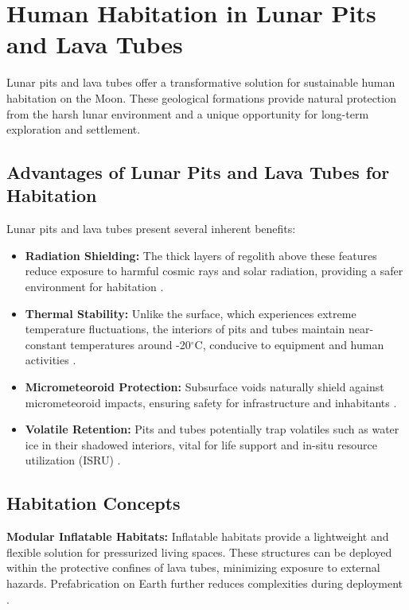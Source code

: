 \graphicspath{{img/ch6}}

\section{Human Habitation in Lunar Pits and Lava Tubes}

Lunar pits and lava tubes offer a transformative solution for sustainable human habitation on the Moon. These geological formations provide natural protection from the harsh lunar environment and a unique opportunity for long-term exploration and settlement.

\subsection{Advantages of Lunar Pits and Lava Tubes for Habitation}

Lunar pits and lava tubes present several inherent benefits:
\begin{itemize}
    \item \textbf{Radiation Shielding:} The thick layers of regolith above these features reduce exposure to harmful cosmic rays and solar radiation, providing a safer environment for habitation \cite{thermal-lunar-pits}.
    \item \textbf{Thermal Stability:} Unlike the surface, which experiences extreme temperature fluctuations, the interiors of pits and tubes maintain near-constant temperatures around -20$^\circ$C, conducive to equipment and human activities \cite{thermal-lunar-pits}.
    \item \textbf{Micrometeoroid Protection:} Subsurface voids naturally shield against micrometeoroid impacts, ensuring safety for infrastructure and inhabitants \cite{lunar-pits-entrances-to-caves}.
    \item \textbf{Volatile Retention:} Pits and tubes potentially trap volatiles such as water ice in their shadowed interiors, vital for life support and in-situ resource utilization (ISRU) \cite{newer-thermal}.
\end{itemize}

\subsection{Habitation Concepts}

\textbf{Modular Inflatable Habitats:}
Inflatable habitats provide a lightweight and flexible solution for pressurized living spaces. These structures can be deployed within the protective confines of lava tubes, minimizing exposure to external hazards. Prefabrication on Earth further reduces complexities during deployment \cite{bases-feng}.

